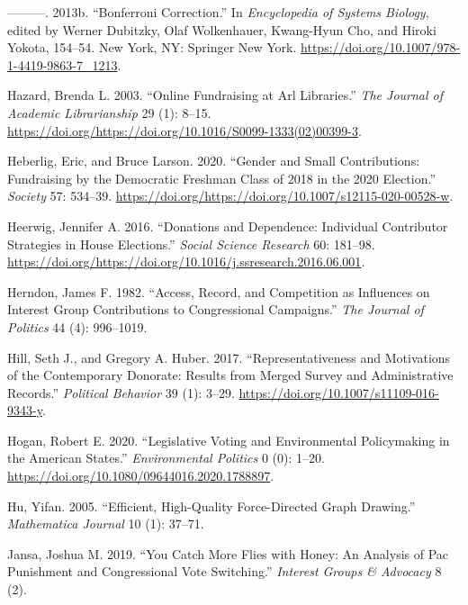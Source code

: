 \documentclass[12pt,]{article}
\begin{document}
\leavevmode\hypertarget{ref-bonferroni}{}%
---------. 2013b. ``Bonferroni Correction.'' In \emph{Encyclopedia of
Systems Biology}, edited by Werner Dubitzky, Olaf Wolkenhauer,
Kwang-Hyun Cho, and Hiroki Yokota, 154--54. New York, NY: Springer New
York. \url{https://doi.org/10.1007/978-1-4419-9863-7_1213}.

\leavevmode\hypertarget{ref-hazard2003}{}%
Hazard, Brenda L. 2003. ``Online Fundraising at Arl Libraries.''
\emph{The Journal of Academic Librarianship} 29 (1): 8--15.
\url{https://doi.org/https://doi.org/10.1016/S0099-1333(02)00399-3}.

\leavevmode\hypertarget{ref-heberlig2020}{}%
Heberlig, Eric, and Bruce Larson. 2020. ``Gender and Small
Contributions: Fundraising by the Democratic Freshman Class of 2018 in
the 2020 Election.'' \emph{Society} 57: 534--39.
\url{https://doi.org/https://doi.org/10.1007/s12115-020-00528-w}.

\leavevmode\hypertarget{ref-heerwig2016}{}%
Heerwig, Jennifer A. 2016. ``Donations and Dependence: Individual
Contributor Strategies in House Elections.'' \emph{Social Science
Research} 60: 181--98.
\url{https://doi.org/https://doi.org/10.1016/j.ssresearch.2016.06.001}.

\leavevmode\hypertarget{ref-herndon1982}{}%
Herndon, James F. 1982. ``Access, Record, and Competition as Influences
on Interest Group Contributions to Congressional Campaigns.'' \emph{The
Journal of Politics} 44 (4): 996--1019.

\leavevmode\hypertarget{ref-hill2017}{}%
Hill, Seth J., and Gregory A. Huber. 2017. ``Representativeness and
Motivations of the Contemporary Donorate: Results from Merged Survey and
Administrative Records.'' \emph{Political Behavior} 39 (1): 3--29.
\url{https://doi.org/10.1007/s11109-016-9343-y}.

\leavevmode\hypertarget{ref-hogan2020}{}%
Hogan, Robert E. 2020. ``Legislative Voting and Environmental
Policymaking in the American States.'' \emph{Environmental Politics} 0
(0): 1--20. \url{https://doi.org/10.1080/09644016.2020.1788897}.

\leavevmode\hypertarget{ref-yifanhu}{}%
Hu, Yifan. 2005. ``Efficient, High-Quality Force-Directed Graph
Drawing.'' \emph{Mathematica Journal} 10 (1): 37--71.

\leavevmode\hypertarget{ref-jansa2019}{}%
Jansa, Joshua M. 2019. ``You Catch More Flies with Honey: An Analysis of
Pac Punishment and Congressional Vote Switching.'' \emph{Interest Groups
\& Advocacy} 8 (2).
\end{document}

